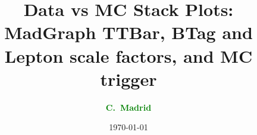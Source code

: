 \documentclass[10pt,xcolor=svgnames,fleqn,aspectratio=169]{beamer}
\title{Data vs MC Stack Plots: MadGraph TTBar, BTag and Lepton scale factors, and MC trigger}
\author{\textcolor{Green}{\bf C.~Madrid\inst{1}}}
\institute{\inst{1} Baylor}
\date{\today}
\begin{document}
\begin{frame}[plain]
\maketitle
\end{frame}





\end{document}
